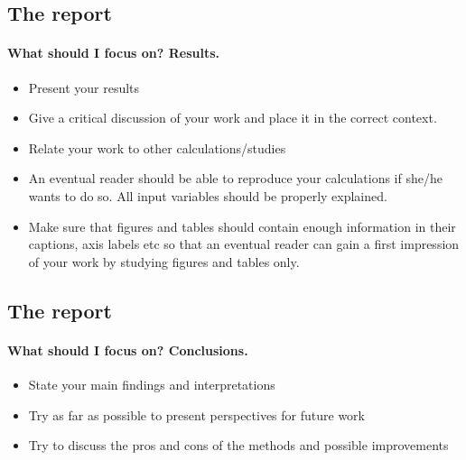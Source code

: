 \documentclass[%
oneside,                 %
final,                   %
10pt]{article}
\begin{document}
\noindent




\subsection*{The report}

\paragraph{What should I focus on? Results.}
\begin{itemize}
 \item Present your results

 \item Give a critical discussion of your work and place it in the correct context.

 \item Relate your work to other calculations/studies

 \item An eventual reader should be able to reproduce your calculations if she/he wants to do so. All input variables should be properly explained.

 \item Make sure that figures and tables should contain enough information in their captions, axis labels etc so that an eventual reader can gain a first impression of your work by studying figures and tables only.
\end{itemize}

\noindent




\subsection*{The report}

\paragraph{What should I focus on? Conclusions.}
\begin{itemize}
 \item State your main findings and interpretations

 \item Try as far as possible to present perspectives for future work

 \item Try to discuss the pros and cons of the methods and possible improvements
\end{itemize}
\end{document}
